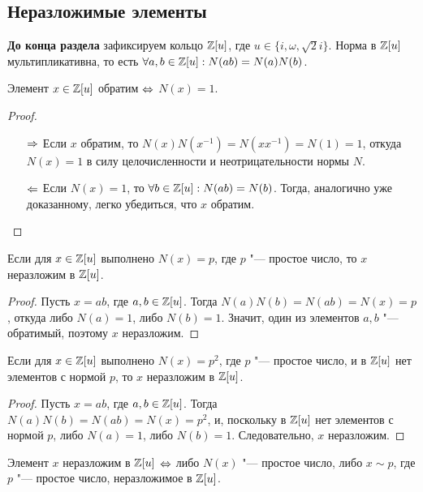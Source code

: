 \subsection{Неразложимые элементы}

\textbf{До конца раздела} зафиксируем кольцо $\mathbb{Z}[u]$, где $u \in \{i, \omega, \sqrt{2}i\}$. Норма в $\mathbb{Z}[u]$ мультипликативна, то есть $\forall a, b \in \mathbb{Z}[u]: N(ab) = N(a)N(b)$.

\begin{proposition}
	Элемент $x \in \mathbb{Z}[u]$ обратим $\Leftrightarrow$ $N(x) = 1$.
\end{proposition}

\begin{proof}~
	\begin{itemize}
		\item[$\Rightarrow$] Если $x$ обратим, то $N(x)N(x^{-1}) = N(xx^{-1}) = N(1) = 1$, откуда $N(x) = 1$ в силу целочисленности и неотрицательности нормы $N$.
		\item[$\Leftarrow$] Если $N(x) = 1$, то $\forall b \in \mathbb{Z}[u]: N(ab) = N(b)$. Тогда, аналогично уже доказанному, легко убедиться, что $x$ обратим.\qedhere
	\end{itemize}
\end{proof}

\begin{proposition}
	Если для $x \in \mathbb{Z}[u]$ выполнено $N(x) = p$, где $p$ "--- простое число, то $x$ неразложим в $\mathbb{Z}[u]$.
\end{proposition}

\begin{proof}
	Пусть $x = ab$, где $a, b \in \mathbb{Z}[u]$. Тогда $N(a)N(b) = N(ab) = N(x) = p$, откуда либо $N(a) = 1$, либо $N(b) = 1$. Значит, один из элементов $a, b$ "--- обратимый, поэтому $x$ неразложим.
\end{proof}

\begin{proposition}
	Если для $x \in \mathbb{Z}[u]$ выполнено $N(x) = p^2$, где $p$ "--- простое число, и в $\mathbb{Z}[u]$ нет элементов с нормой $p$, то $x$ неразложим в $\mathbb{Z}[u]$.
\end{proposition}

\begin{proof}
	Пусть $x = ab$, где $a, b \in \mathbb{Z}[u]$. Тогда $N(a)N(b) = N(ab) = N(x) = p^2$, и, поскольку в $\mathbb{Z}[u]$ нет элементов с нормой $p$, либо $N(a) = 1$, либо $N(b) = 1$. Следовательно, $x$ неразложим.
\end{proof}

\begin{theorem}
	Элемент $x$ неразложим в $\mathbb{Z}[u]$ $\Leftrightarrow$ либо $N(x)$ "--- простое число, либо $x \sim p$, где $p$ "--- простое число, неразложимое в $\mathbb{Z}[u]$.
\end{theorem}

